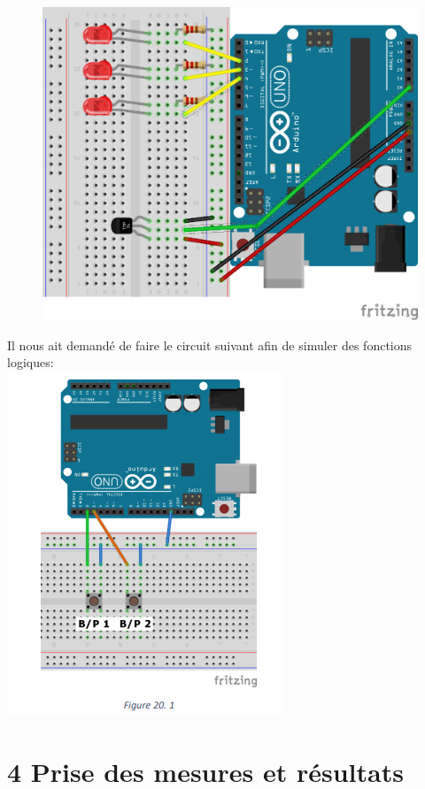 \documentclass{report}
\begin{document}
\begin{figure}[h!]
\centering
\includegraphics[scale=0.25]{Love.png}
\end{figure}
\newpage
Il nous ait demandé de faire le circuit suivant afin de simuler des fonctions logiques:\\
\includegraphics{FctLog.png} 



\section*{4 Prise des mesures et résultats}
\end{document}
